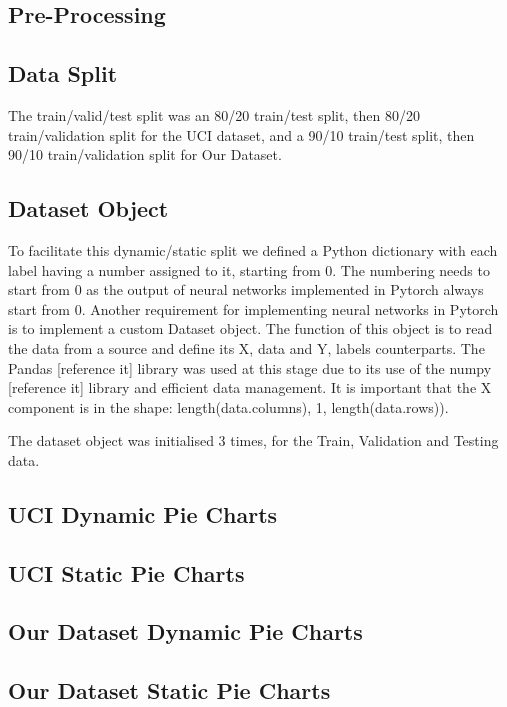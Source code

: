     \subsection{Pre-Processing}
        \subsection{Data Split}
            The train/valid/test split was an 80/20 train/test split, then 80/20 train/validation split for the UCI dataset, and a 90/10 train/test split, then 90/10 train/validation split for Our Dataset.
        \subsection{Dataset Object}
            To facilitate this dynamic/static split we defined a Python dictionary with each label having a number assigned to it, starting from 0.
            The numbering needs to start from 0 as the output of neural networks implemented in Pytorch always start from 0.
            Another requirement for implementing neural networks in Pytorch is to implement a custom Dataset object.
            The function of this object is to read the data from a source and define its X, data and Y, labels counterparts.
            The Pandas [reference it] library was used at this stage due to its use of the numpy [reference it] library and efficient data management.
            It is important that the X component is in the shape: length(data.columns), 1, length(data.rows)).

            The dataset object was initialised 3 times, for the Train, Validation and Testing data.

            \subsection{UCI Dynamic Pie Charts}
            \subsection{UCI Static Pie Charts}
            \subsection{Our Dataset Dynamic Pie Charts}
            \subsection{Our Dataset Static Pie Charts}

